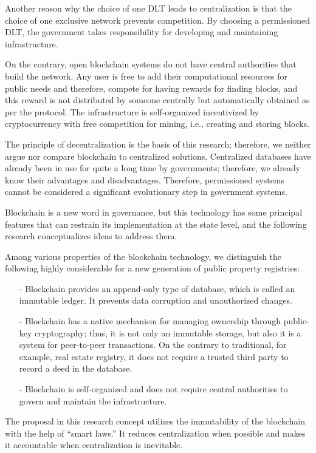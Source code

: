 \begin{multicols}{2}
Another reason why the choice of one DLT leads to centralization is that the choice of one exclusive network prevents competition. By choosing a permissioned DLT, the government takes responsibility for developing and maintaining infrastructure.

On the contrary, open blockchain systems do not have central authorities that build the network. Any user is free to add their computational resources for public needs and therefore, compete for having rewards for finding blocks, and this reward is not distributed by someone centrally but automatically obtained as per the protocol. The infrastructure is self-organized incentivized by cryptocurrency with free competition for mining, i.e., creating and storing blocks.

The principle of decentralization is the basis of this research; therefore, we neither argue nor compare blockchain to centralized solutions. Centralized databases have already been in use for quite a long time by governments; therefore, we already know their advantages and disadvantages. Therefore, permissioned systems cannot be considered a significant evolutionary step in government systems.

Blockchain is a new word in governance, but this technology has some principal features that can restrain its implementation at the state level, and the following research conceptualizes ideas to address them.

Among various properties of the blockchain technology, we distinguish the following highly considerable for a new generation of public property registries:
\begin{itemize}
\item[-] Blockchain provides an append-only type of database, which is called an immutable ledger. It prevents data corruption and unauthorized changes.
\item[-] Blockchain has a native mechanism for managing ownership through public-key cryptography; thus, it is not only an immutable storage, but also it is a system for peer-to-peer transactions. On the contrary to traditional, for example, real estate registry, it does not require a trusted third party to record a deed in the database.
\item[-] Blockchain is self-organized and does not require central authorities to govern and maintain the infrastructure.
\end{itemize}

The proposal in this research concept utilizes the immutability of the blockchain with the help of “smart laws.” It reduces centralization when possible and makes it accountable when centralization is inevitable.


\end{multicols}
